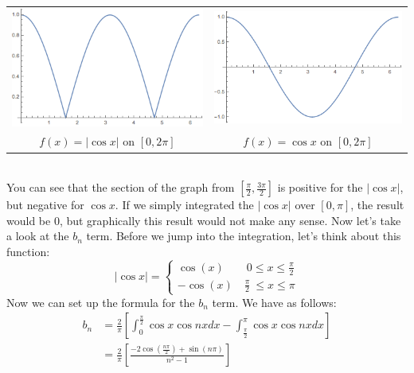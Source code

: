 \begin{center}
\begin{tabular}{c c}
\includegraphics[scale=0.5]{cos_abs} & \includegraphics[scale=0.5]{cos}\\
$f(x) = |\cos{x}|$ on $[0,2\pi]$ & $f(x) = \cos{x}$ on $[0,2\pi]$
\end{tabular}
\end{center}
\noindent\\ You can see that the section of the graph from
$[\frac{\pi}{2},\frac{3 \pi}{2}]$ is positive for the $|\cos{x}|$, but negative
for $\cos{x}$. If we simply integrated the $|\cos{x}|$ over $[0,\pi]$, the
result would be 0, but graphically this result would not make any sense. Now
let's take a look at the $b_{n}$ term. Before we jump into the integration,
let's think about this function:
\[\left|\cos{x}\right| =
\begin{cases*}
\cos(x) \qquad 0\leq x \leq \frac{\pi}{2}\\
-\cos(x)\quad  \frac{\pi}{2}\ \leq x \leq \pi
\end{cases*}
\]
\noindent Now we can set up the formula for the $b_{n}$ term. We have as follows:
\begin{align*}
b_{n} &= \frac{2}{\pi}\left[ \int_{0}^{\frac{\pi}{2}} \cos{x}\cos{nx}dx - \int_{\frac{\pi}{2}}^{\pi}
\cos{x}\cos{nx}dx \right]\\
&= \frac{2}{\pi} \left[ \frac{-2 \cos{\left(\frac{n\pi}{2}\right)} + \sin{\left(n\pi\right)}}{n^{2} -
1}\right]\\
\end{align*}
